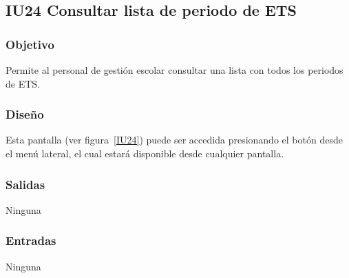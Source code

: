 
\subsection{IU24 Consultar lista de periodo de ETS}
\subsubsection{Objetivo}
   Permite al personal de gestión escolar consultar una lista con todos los periodos de ETS.
\subsubsection{Diseño}
    Esta pantalla  (ver figura~\ref{IU24}) puede ser accedida presionando el botón  desde el menú lateral, el cual estará disponible desde cualquier pantalla. 

\subsubsection{Salidas}
Ninguna
\subsubsection{Entradas}
Ninguna
